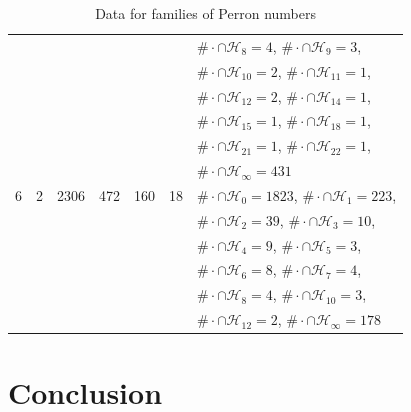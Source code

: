 \documentclass[12pt]{article}
\theoremstyle{plain}
\theoremstyle{remark}
\begin{document}
\begin{table}
\begin{tabular}{lllllll}
 &&&&&& $\# \cdot \cap \mathcal{H}_{8} = 4$, $\# \cdot \cap \mathcal{H}_{9} = 3$, \\ 
 &&&&&& $\# \cdot \cap \mathcal{H}_{10} = 2$, $\# \cdot \cap \mathcal{H}_{11} = 1$, \\ 
 &&&&&& $\# \cdot \cap \mathcal{H}_{12} = 2$, $\# \cdot \cap \mathcal{H}_{14} = 1$, \\ 
 &&&&&& $\# \cdot \cap \mathcal{H}_{15} = 1$, $\# \cdot \cap \mathcal{H}_{18} = 1$, \\ 
 &&&&&& $\# \cdot \cap \mathcal{H}_{21} = 1$, $\# \cdot \cap \mathcal{H}_{22} = 1$, \\ 
 &&&&&& $\# \cdot \cap \mathcal{H}_{\infty} = 431$ \\ \hline 
6& 2 &  2306&  472&  160&  18 & $\# \cdot \cap \mathcal{H}_{0} = 1823$, $\# \cdot \cap \mathcal{H}_{1} = 223$, \\ 
 &&&&&& $\# \cdot \cap \mathcal{H}_{2} = 39$, $\# \cdot \cap \mathcal{H}_{3} = 10$, \\ 
 &&&&&& $\# \cdot \cap \mathcal{H}_{4} = 9$, $\# \cdot \cap \mathcal{H}_{5} = 3$, \\ 
 &&&&&& $\# \cdot \cap \mathcal{H}_{6} = 8$, $\# \cdot \cap \mathcal{H}_{7} = 4$, \\ 
 &&&&&& $\# \cdot \cap \mathcal{H}_{8} = 4$, $\# \cdot \cap \mathcal{H}_{10} = 3$, \\ 
 &&&&&& $\# \cdot \cap \mathcal{H}_{12} = 2$, $\# \cdot \cap \mathcal{H}_{\infty} = 178$ \\ \hline 
\end{tabular}
\caption{Data for families of Perron numbers} \label{tab:Q}
\end{table}

 \section{ Conclusion }
\label{sec:4}
\end{document}
